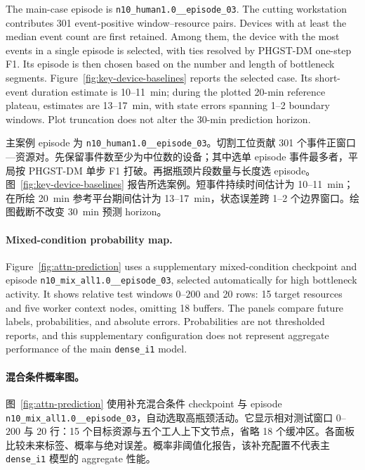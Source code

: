 \documentclass[a4paper,fleqn]{cas-dc}
\newcommand{\zhpara}[1]{%
  \par\begingroup\small\color{black!72}\noindent #1\par\endgroup}
\begin{document}
The main-case episode is \texttt{n10\_human1.0\_\_episode\_03}. The cutting workstation contributes 301 event-positive window--resource pairs. Devices with at least the median event count are first retained. Among them, the device with the most events in a single episode is selected, with ties resolved by PHGST-DM one-step F1. Its episode is then chosen based on the number and length of bottleneck segments. Figure~\ref{fig:key-device-baselines} reports the selected case. Its short-event duration estimate is 10--11~min; during the plotted 20-min reference plateau, estimates are 13--17~min, with state errors spanning 1--2 boundary windows. Plot truncation does not alter the 30-min prediction horizon.

\zhpara{主案例 episode 为 \texttt{n10\_human1.0\_\_episode\_03}。切割工位贡献 301 个事件正窗口—资源对。先保留事件数至少为中位数的设备；其中选单 episode 事件最多者，平局按 PHGST-DM 单步 F1 打破。再据瓶颈片段数量与长度选 episode。图~\ref{fig:key-device-baselines} 报告所选案例。短事件持续时间估计为 10--11~min；在所绘 20~min 参考平台期间估计为 13--17~min，状态误差跨 1--2 个边界窗口。绘图截断不改变 30~min 预测 horizon。}












\paragraph*{Mixed-condition probability map.}
Figure~\ref{fig:attn-prediction} uses a supplementary mixed-condition checkpoint and episode \texttt{n10\_mix\_all1.0\_\_episode\_03}, selected automatically for high bottleneck activity. It shows relative test windows $0$--$200$ and 20 rows: 15 target resources and five worker context nodes, omitting 18 buffers. The panels compare future labels, probabilities, and absolute errors. Probabilities are not thresholded reports, and this supplementary configuration does not represent aggregate performance of the main \texttt{dense\_i1} model.

\zhpara{\paragraph*{混合条件概率图。}
图~\ref{fig:attn-prediction} 使用补充混合条件 checkpoint 与 episode \texttt{n10\_mix\_all1.0\_\_episode\_03}，自动选取高瓶颈活动。它显示相对测试窗口 $0$--$200$ 与 20 行：15 个目标资源与五个工人上下文节点，省略 18 个缓冲区。各面板比较未来标签、概率与绝对误差。概率非阈值化报告，该补充配置不代表主 \texttt{dense\_i1} 模型的 aggregate 性能。}
\end{document}
